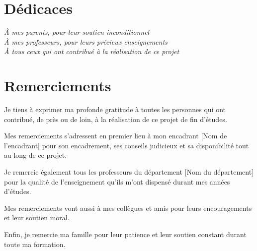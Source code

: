 \documentclass[12pt,a4paper]{report}
\begin{document}

\chapter*{Dédicaces}
\thispagestyle{empty}

\vspace*{3cm}
\begin{center}
\textit{À mes parents, pour leur soutien inconditionnel}\\[0.5cm]
\textit{À mes professeurs, pour leurs précieux enseignements}\\[0.5cm]
\textit{À tous ceux qui ont contribué à la réalisation de ce projet}
\end{center}

\newpage


\chapter*{Remerciements}
\thispagestyle{empty}

Je tiens à exprimer ma profonde gratitude à toutes les personnes qui ont contribué, de près ou de loin, à la réalisation de ce projet de fin d'études.

Mes remerciements s'adressent en premier lieu à mon encadrant [Nom de l'encadrant] pour son encadrement, ses conseils judicieux et sa disponibilité tout au long de ce projet.

Je remercie également tous les professeurs du département [Nom du département] pour la qualité de l'enseignement qu'ils m'ont dispensé durant mes années d'études.

Mes remerciements vont aussi à mes collègues et amis pour leurs encouragements et leur soutien moral.

Enfin, je remercie ma famille pour leur patience et leur soutien constant durant toute ma formation.

\newpage

\end{document}
